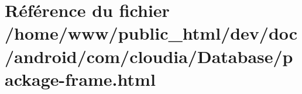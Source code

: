 \hypertarget{com_2cloudia_2_database_2package-frame_8html}{\section{Référence du fichier /home/www/public\-\_\-html/dev/doc/android/com/cloudia/\-Database/package-\/frame.html}
\label{com_2cloudia_2_database_2package-frame_8html}
}
